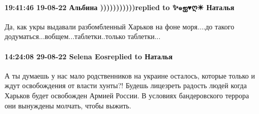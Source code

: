  
 
 
 
 

\paragraph{19:41:46 19-08-22 Альбина )))))))))))replied to ✨๑ஐ♥ღ☀ Наталья💛}

Да, как укры выдавали разбомбленный Харьков на фоне моря....до такого
додуматься...вобщем...таблетки..только таблетки...

\paragraph{14:24:08 29-08-22 Selena Eosreplied to Наталья}

А ты думаешь у нас мало родственников на украине осталось, которые только и
ждут освобождения от власти хунты?! Будешь лицезреть радость людей когда
Харьков будет освобожден Армией России. В условиях бандеровского террора они
вынуждены молчать, чтобы выжить.
